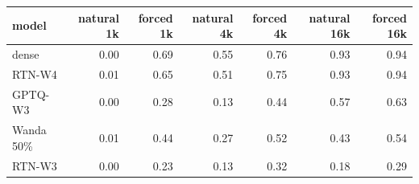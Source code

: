 \begin{tabular}{lrrrrrr}
\toprule
model & natural 1k & forced 1k & natural 4k & forced 4k & natural 16k & forced 16k \\
\midrule
dense & 0.00 & 0.69 & 0.55 & 0.76 & 0.93 & 0.94 \\
RTN-W4 & 0.01 & 0.65 & 0.51 & 0.75 & 0.93 & 0.94 \\
GPTQ-W3 & 0.00 & 0.28 & 0.13 & 0.44 & 0.57 & 0.63 \\
Wanda 50\% & 0.01 & 0.44 & 0.27 & 0.52 & 0.43 & 0.54 \\
RTN-W3 & 0.00 & 0.23 & 0.13 & 0.32 & 0.18 & 0.29 \\
\bottomrule
\end{tabular}
